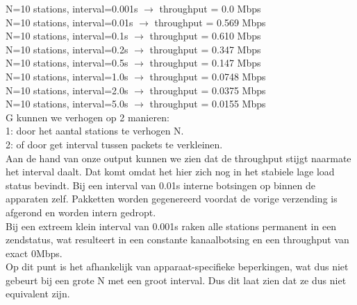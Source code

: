 N=10 stations, interval=0.001s $\rightarrow$ throughput = 0.0 Mbps\\
N=10 stations, interval=0.01s  $\rightarrow$ throughput = 0.569 Mbps\\
N=10 stations, interval=0.1s  $\rightarrow$ throughput = 0.610 Mbps\\
N=10 stations, interval=0.2s  $\rightarrow$ throughput = 0.347 Mbps\\
N=10 stations, interval=0.5s  $\rightarrow$ throughput = 0.147 Mbps\\
N=10 stations, interval=1.0s  $\rightarrow$ throughput = 0.0748 Mbps\\
N=10 stations, interval=2.0s  $\rightarrow$ throughput = 0.0375 Mbps\\
N=10 stations, interval=5.0s  $\rightarrow$ throughput = 0.0155 Mbps\\

G kunnen we verhogen op 2 manieren:\\

1: door het aantal stations te verhogen N.\\
2: of door get interval tussen packets te verkleinen. \\

Aan de hand van onze output kunnen we zien dat de throughput stijgt naarmate het interval daalt. Dat komt omdat het hier zich nog in het stabiele lage load status bevindt. Bij een interval van 0.01s interne botsingen op binnen de apparaten zelf. Pakketten worden gegenereerd voordat de vorige verzending is afgerond en worden intern gedropt.\\

Bij een extreem klein interval van 0.001s raken alle stations permanent in een zendstatus, wat resulteert in een constante kanaalbotsing en een throughput van exact 0Mbps.\\

Op dit punt is het afhankelijk van apparaat-specifieke beperkingen, wat dus niet gebeurt bij een grote N met een groot interval. Dus dit laat zien dat ze dus niet equivalent zijn.